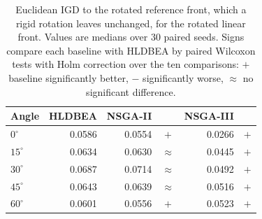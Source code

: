 \begin{table}[!htbp]
\centering
\caption{Euclidean IGD to the rotated reference front, which a rigid rotation leaves unchanged, for the rotated linear front. Values are medians over 30 paired seeds. Signs compare each baseline with HLDBEA by paired Wilcoxon tests with Holm correction over the ten comparisons: $+$ baseline significantly better, $-$ significantly worse, $\approx$ no significant difference.}
\label{tab:rotation_igd}
\small
\begin{tabular}{|l|r|rc|rc|}
\hline
\textbf{Angle} & \textbf{HLDBEA} & \textbf{NSGA-II} & & \textbf{NSGA-III} & \\ \hline
$0^\circ$ & 0.0586 & 0.0554 & $+$ & 0.0266 & $+$ \\
$15^\circ$ & 0.0634 & 0.0630 & $\approx$ & 0.0445 & $+$ \\
$30^\circ$ & 0.0687 & 0.0714 & $\approx$ & 0.0492 & $+$ \\
$45^\circ$ & 0.0643 & 0.0639 & $\approx$ & 0.0516 & $+$ \\
$60^\circ$ & 0.0601 & 0.0556 & $+$ & 0.0523 & $+$ \\
\hline
\end{tabular}
\end{table}

